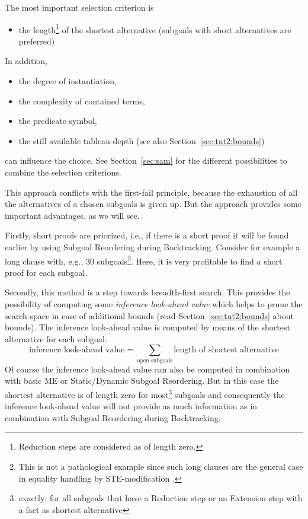 The most important selection criterion is 
\begin{itemize}
\item the length\footnote{Reduction steps are considered as of length
		zero.} 
	of the shortest alternative (subgoals with short alternatives
	are preferred) 
\end{itemize}
In addition,
\begin{itemize}
\item the degree of instantiation,
\item the complexity of contained terms,
\item the predicate symbol,
\item the still available tableau-depth (see
	also Section~\ref{sec:tut2:bounds})
\end{itemize}
can influence the choice. See Section~\ref{sec:sam} for the different
possibilities to combine the selection criterions.

This approach conflicts with the first-fail principle, because the
exhaustion of all the alternatives of a chosen subgoals is given
up. But the approach provides some important advantages, as we will
see. 

Firstly, short proofs are priorized, i.e., if there is a short proof
it will be found earlier by using Subgoal Reordering during
Backtracking. Consider for example a long clause with, e.g., 30
subgoals\footnote{This is not a pathological example since such long
	clauses are the general case in equality handling by
STE-modification \cite{}.}. 
Here, it is very profitable to find a short proof for each subgoal.

Secondly, this method is a step towards breadth-first search. This
provides the possibility of computing some {\em inference look-ahead
value\/} which helps to prune the search space in case of additional
bounds (read Section~\ref{sec:tut2:bounds} about bounds). The
inference look-ahead value is computed by means of the shortest
alternative for each subgoal:
\begin{displaymath}
\mbox{inference look-ahead value} = \sum_{\mbox{open subgoals}} \mbox{length of shortest alternative}
\end{displaymath}
Of course the inference look-ahead value can also be computed in
combination with basic ME or Static/Dynamic Subgoal Reordering. But in
this case the shortest alternative is of length zero for
most\footnote{exactly: for all subgoals that have a Reduction step or
	an Extension step with a fact as shortest alternative} 
subgoals and consequently the inference look-ahead value will not
provide as much information as in combination with Subgoal Reordering
during Backtracking. 

